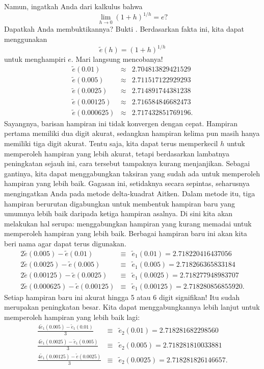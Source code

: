 \noindent Namun, ingatkah Anda dari kalkulus bahwa 
\[
\lim_{h\to0}(1+h)^{1/h}=e?
\]
Dapatkah Anda membuktikannya? Bukti . Berdasarkan
fakta ini, kita dapat menggunakan 
\[
\tilde{e}(h)=(1+h)^{1/h}
\]
untuk menghampiri $e$. Mari langsung mencobanya!
\begin{eqnarray*}
\tilde{e}(0.01) & \approx & 2.704813829421529\\
\tilde{e}(0.005) & \approx & 2.711517122929293\\
\tilde{e}(0.0025) & \approx & 2.714891744381238\\
\tilde{e}(0.00125) & \approx & 2.716584846682473\\
\tilde{e}(0.000625) & \approx & 2.717432851769196.
\end{eqnarray*}
Sayangnya, barisan hampiran ini tidak konvergen dengan cepat. Hampiran
pertama memiliki dua digit akurat, sedangkan hampiran kelima pun masih
hanya memiliki tiga digit akurat. Tentu saja, kita dapat terus memperkecil
$h$ untuk memperoleh hampiran yang lebih akurat, tetapi berdasarkan
lambatnya peningkatan sejauh ini, cara tersebut tampaknya kurang menjanjikan.
Sebagai gantinya, kita dapat menggabungkan taksiran yang sudah ada
untuk memperoleh hampiran yang lebih baik. Gagasan ini, setidaknya
secara sepintas, seharusnya mengingatkan Anda pada metode delta-kuadrat
Aitken. Dalam metode itu, tiga hampiran berurutan digabungkan untuk
membentuk hampiran baru yang umumnya lebih baik daripada ketiga hampiran
asalnya. Di sini kita akan melakukan hal serupa: menggabungkan hampiran
yang kurang memadai untuk memperoleh hampiran yang lebih baik. Berbagai
hampiran baru ini akan kita beri nama agar dapat terus digunakan.
\begin{eqnarray}
2\tilde{e}(0.005)-\tilde{e}(0.01) & \equiv & \tilde{e}_{1}(0.01)=2.718220416437056\nonumber \\
2\tilde{e}(0.0025)-\tilde{e}(0.005) & \equiv & \tilde{e}_{1}(0.005)=2.718266365833184\nonumber \\
2\tilde{e}(0.00125)-\tilde{e}(0.0025) & \equiv & \tilde{e}_{1}(0.0025)=2.718277948983707\nonumber \\
2\tilde{e}(0.000625)-\tilde{e}(0.00125) & \equiv & \tilde{e}_{1}(0.00125)=2.718280856855920.\label{eq:richardsonC2}
\end{eqnarray}
Setiap hampiran baru ini akurat hingga 5 atau 6 digit signifikan!
Itu sudah merupakan peningkatan besar. Kita dapat menggabungkannya
lebih lanjut untuk memperoleh hampiran yang lebih baik lagi:
\begin{eqnarray}
\frac{4\tilde{e}_{1}(0.005)-\tilde{e}_{1}(0.01)}{3} & \equiv & \tilde{e}_{2}(0.01)=2.718281682298560\nonumber \\
\frac{4\tilde{e}_{1}(0.0025)-\tilde{e}_{1}(0.005)}{3} & \equiv & \tilde{e}_{2}(0.005)=2.718281810033881\nonumber \\
\frac{4\tilde{e}_{1}(0.00125)-\tilde{e}(0.0025)}{3} & \equiv & \tilde{e}_{2}(0.0025)=2.718281826146657.\label{eq:richardsonC3}
\end{eqnarray}
